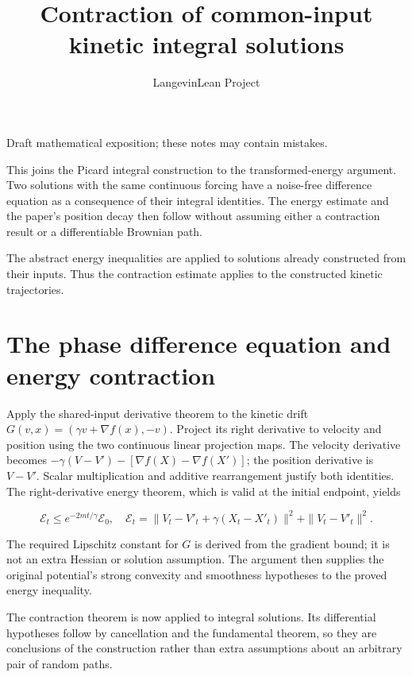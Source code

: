 \documentclass[11pt,a4paper]{article}
\title{\texorpdfstring{Contraction of common-input kinetic integral solutions}{Contraction of common-input kinetic integral solutions}}
\author{LangevinLean Project}
\date{}
\begin{document}
\maketitle
Draft mathematical exposition; these notes may contain mistakes.


This joins the Picard integral construction to the transformed-energy argument. Two solutions with the same continuous forcing have a noise-free difference equation as a consequence of their integral identities. The energy estimate and the paper's position decay then follow without assuming either a contraction result or a differentiable Brownian path.



The abstract energy inequalities are applied to solutions already constructed from their inputs. Thus the contraction estimate applies to the constructed kinetic trajectories.


\section{\texorpdfstring{The phase difference equation and energy contraction}{The phase difference equation and energy contraction}}


Apply the shared-input derivative theorem to the kinetic drift \(G(v,x)=(\gamma v+\nabla f(x),-v)\). Project its right derivative to velocity and position using the two continuous linear projection maps. The velocity derivative becomes \(-\gamma(V-V\prime)-[\nabla f(X)-\nabla f(X\prime)]\); the position derivative is \(V-V\prime\). Scalar multiplication and additive rearrangement justify both identities. The right-derivative energy theorem, which is valid at the initial endpoint, yields

\[\mathcal E_t\le e^{-2mt/\gamma}\mathcal E_0,\quad\mathcal E_t=\|V_t-V\prime_t+\gamma(X_t-X\prime_t)\|^2+\|V_t-V\prime_t\|^2.\]

The required Lipschitz constant for \(G\) is derived from the gradient bound; it is not an extra Hessian or solution assumption. The argument then supplies the original potential's strong convexity and smoothness hypotheses to the proved energy inequality.



The contraction theorem is now applied to integral solutions. Its differential hypotheses follow by cancellation and the fundamental theorem, so they are conclusions of the construction rather than extra assumptions about an arbitrary pair of random paths.
\end{document}
